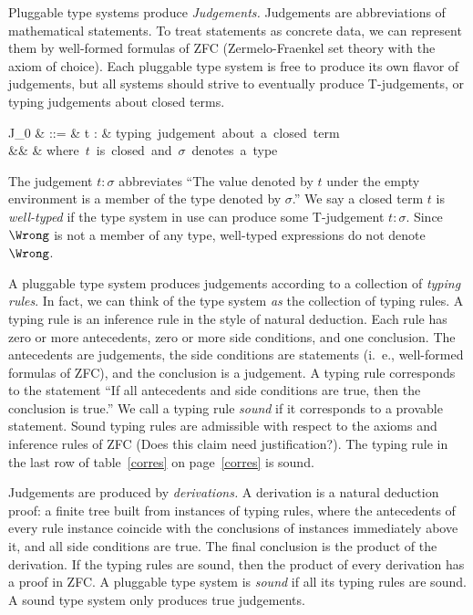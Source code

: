 \documentclass{amsart}
\begin{document}
Pluggable type systems produce \emph{Judgements.} Judgements are
abbreviations of mathematical statements. To treat statements as
concrete data, we can represent them by well-formed formulas of
ZFC (Zermelo-Fraenkel set theory with the axiom of choice). Each
pluggable type system is free to produce its own flavor of
judgements, but all systems should strive to eventually produce
T-judgements, or typing judgements about closed terms.
\begin{syntax}
J_0
& ::=
& t : \sigma
   & \mbox{typing judgement about a closed term} \\
&& & \mbox{where $t$ is closed and $\sigma$ denotes a type}
\end{syntax}%
The judgement $t:\sigma$ abbreviates ``The value denoted by $t$
under the empty environment is a member of the type denoted by
$\sigma$.'' We say a closed term $t$ is \emph{well-typed} if the
type system in use can produce some T-judgement $t:\sigma$.
Since $\Wrong$ is not a member of any type, well-typed
expressions do not denote $\Wrong$.

A pluggable type system produces judgements according to a
collection of \emph{typing rules}. In fact, we can think of the
type system \emph{as} the collection of typing rules. A typing
rule is an inference rule in the style of natural deduction. Each
rule has zero or more antecedents, zero or more side conditions,
and one conclusion. The antecedents are judgements, the side
conditions are statements (i.~e., well-formed formulas of ZFC),
and the conclusion is a judgement. A typing rule corresponds to
the statement ``If all antecedents and side conditions are true,
then the conclusion is true.'' We call a typing rule \emph{sound}
if it corresponds to a provable statement. Sound typing rules are
admissible with respect to the axioms and inference rules of ZFC
(Does this claim need justification?). The typing rule in the
last row of table~\ref{corres} on page~\ref{corres} is sound.

Judgements are produced by \emph{derivations.} A derivation is a
natural deduction proof: a finite tree built from instances of
typing rules, where the antecedents of every rule instance
coincide with the conclusions of instances immediately above it,
and all side conditions are true. The final conclusion is the
product of the derivation. If the typing rules are sound, then
the product of every derivation has a proof in ZFC. A pluggable
type system is \emph{sound} if all its typing rules are sound. A
sound type system only produces true judgements.
\end{document}
